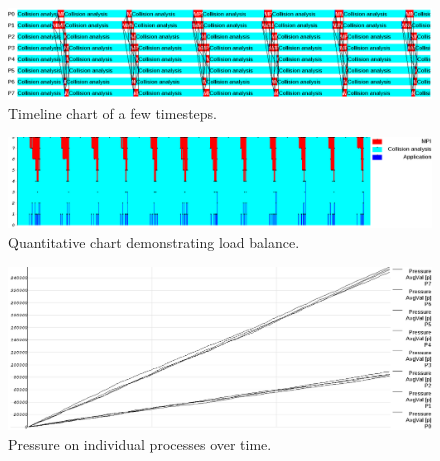 \documentclass[a4paper,11pt]{article}
\begin{document}
\begin{figure}[!h]
  \caption{Timeline chart of a few timesteps.}
  \label{timeline}
  \includegraphics[width=15cm]{chart_load_balance.png}
\end{figure}

\begin{figure}[!h]
  \caption{Quantitative chart demonstrating load balance.}
  \label{quantitive}
  \includegraphics[width=15cm]{chart_quantitative.png}
\end{figure}

\begin{figure}[!h]
  \caption{Pressure on individual processes over time.}
  \label{pressure}
  \includegraphics[width=15cm]{chart_pressure.png}
\end{figure}

\clearpage
\end{document}
